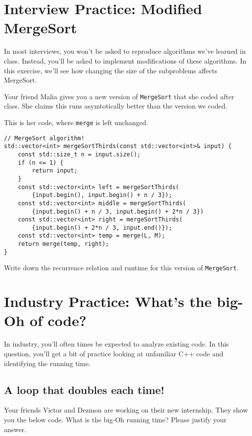 \documentclass [12pt]{article}
\begin{document}


\pagebreak
\section{Interview Practice: Modified MergeSort}
 In most interviews, you won't be asked to reproduce algorithms we've learned in class. Instead, you'll be asked to implement modifications of these algorithms. In this exercise, we'll see how changing the size of the subproblems affects MergeSort.

Your friend Malia gives you a new version of \texttt{MergeSort} that she coded after class. She claims this runs asymtotically better than the version we coded.

This is her code, where \texttt{merge} is left unchanged.

\vspace{2em}
\begin{verbatim}
// MergeSort algorithm!
std::vector<int> mergeSortThirds(const std::vector<int>& input) {
    const std::size_t n = input.size();
    if (n <= 1) {
        return input;
    }
    const std::vector<int> left = mergeSortThirds(
        {input.begin(), input.begin() + n / 3});
    const std::vector<int> middle = mergeSortThirds(
        {input.begin() + n / 3, input.begin() + 2*n / 3})
    const std::vector<int> right = mergeSortThirds(
        {input.begin() + 2*n / 3, input.end()});
    const std::vector<int> temp = merge(L, M);
    return merge(temp, right);
}
\end{verbatim}

Write down the recurrence relation and runtime for this version of \texttt{MergeSort}.

 

\pagebreak
\section{Industry Practice: What's the big-Oh of code?}
 In industry, you'll often times be expected to analyze existing code. In this question, you'll get a bit of practice looking at unfamiliar C++ code and identifying the running time.


\subsection{A loop that doubles each time!}
 Your friends Victor and Dezmon are working on their new internship. They show you the below code. What is the big-Oh running time? Please justify your answer.
\end{document}
